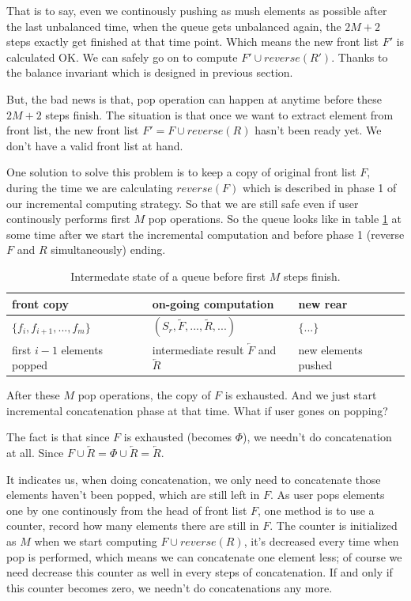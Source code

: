 \documentclass{article}
\begin{document}
That is to say, even we continously pushing as mush elements as possible after 
the last unbalanced time, when the queue gets unbalanced again, the $2M+2$ steps
exactly get finished at that time point. Which means the new front list $F'$ is
calculated OK. We can safely go on to compute $F' \cup reverse(R')$. Thanks to the
balance invariant which is designed in previous section.

But, the bad news is that, pop operation can happen at anytime before these
$2M+2$ steps finish. The situation is that once we want to extract element 
from front list, the new front list $F' = F \cup reverse(R)$ hasn't been
ready yet. We don't have a valid front list at hand.

One solution to solve this problem is to keep a copy of original front list $F$,
during the time we are calculating $reverse(F)$ which is described in phase 1 of
our incremental computing strategy. So that we are still safe even if user
continously performs first $M$ pop operations. So the queue looks like
in table \ref{tab:pop-before-m} at some time after we start the incremental computation and before
phase 1 (reverse $F$ and $R$ simultaneously) ending.

\begin{table}
\centering
\begin{tabular}{l l l}
  front copy & on-going computation & new rear \\
  \hline
  $\{ f_i, f_{i+1}, ..., f_m \}$ & $(S_r, \tilde{F}, ..., \tilde{R}, ...)$ & $ \{ ... \}$ \\
  first $i-1$ elements popped & intermediate result $\overleftarrow{F}$ and $\overleftarrow{R}$ & new elements pushed
\end{tabular}
\caption{Intermedate state of a queue before first $M$ steps finish.}
\label{tab:pop-before-m}
\end{table}

After these $M$ pop operations, the copy of $F$ is exhausted. And we just
start incremental concatenation phase at that time. What if user gones
on popping?

The fact is that since $F$ is exhausted (becomes $\Phi$), we needn't do concatenation
at all. Since $F \cup \overleftarrow{R} = \Phi \cup \overleftarrow{R} = \overleftarrow{R}$.

It indicates us, when doing concatenation, we only need to concatenate those elements
haven't been popped, which are still left in $F$. As user pops elements one by one
continously from the head of front list $F$, one method is to use a counter,
record how many elements there are still in $F$. The counter is initialized as $M$
when we start computing $F \cup reverse(R)$, it's decreased every time when pop is
performed, which means we can concatenate one element less; of course we need decrease
this counter as well in every steps of concatenation. If and only if this counter
becomes zero, we needn't do concatenations any more.
\end{document}
